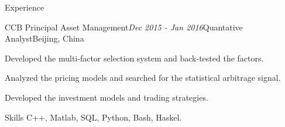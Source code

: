 \documentclass{resume} %
\begin{document}

\begin{rSection}{Experience}


\begin{rSubsection}{CCB Principal Asset Management}{\em Dec 2015 - Jan 2016}{Quantative Analyst}{Beijing, China}
\item Developed the multi-factor selection system and back-tested the factors.
\item Analyzed the pricing models and searched for the statistical arbitrage signal.
\item Developed the investment models and trading strategies.

\end{rSubsection}




\end{rSection}




\begin{rSection}{Skills}
C++, Matlab, SQL, Python, Bash, Haskel.

\end{rSection}













\end{document}
